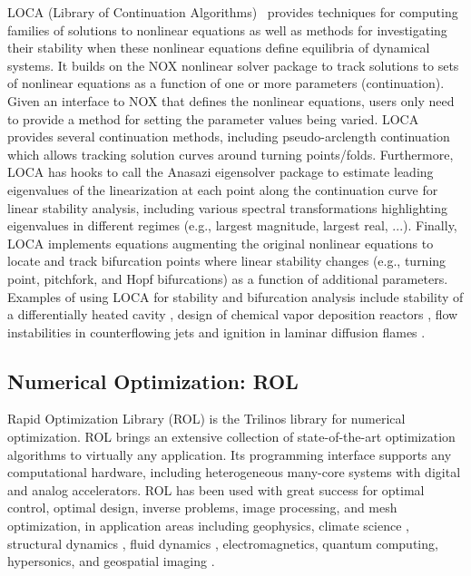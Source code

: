 LOCA (Library of Continuation Algorithms)~\cite{Salinger2005}
provides techniques for computing families of solutions to nonlinear equations as well as methods for investigating their stability when these nonlinear equations define equilibria of dynamical systems.  It builds on the NOX nonlinear solver package to track solutions to sets of nonlinear equations as a function of one or more parameters (continuation).
Given an interface to NOX that defines the nonlinear equations, users only need to provide a method for setting the parameter values being varied.
LOCA provides several continuation methods, including pseudo-arclength continuation which allows tracking solution curves around turning points/folds.  Furthermore, LOCA has hooks to call the Anasazi eigensolver package to estimate leading eigenvalues of the linearization at each point along the continuation curve for linear stability analysis, including various spectral transformations highlighting eigenvalues in different regimes (e.g., largest magnitude, largest real, ...).  Finally, LOCA implements equations augmenting the original nonlinear equations to locate and track bifurcation points where linear stability changes (e.g., turning point, pitchfork, and Hopf bifurcations) as a function of additional parameters. Examples of using LOCA for stability and bifurcation analysis include stability of a differentially heated cavity \cite{Salinger2002}, design of chemical vapor deposition reactors \cite{Pawlowski2001}, flow instabilities in counterflowing jets \cite{pawlowski_salinger_shadid_mountziaris_2006} and ignition in laminar diffusion flames \cite{Shadid20061846}.



\subsection{Numerical Optimization: ROL}
Rapid Optimization Library (ROL) \cite{rol,ROL2022ICCOPT} is the
Trilinos library for numerical optimization. ROL brings an extensive
collection of state-of-the-art optimization algorithms to virtually
any application. Its programming interface supports any computational
hardware, including heterogeneous many-core systems with digital and
analog accelerators.
ROL has been used with great success for optimal control, optimal design,
inverse problems, image processing, and mesh optimization, in application
areas including geophysics, climate science \cite{Perego2022}, structural
dynamics \cite{AQUINO2019323,BUNTING2021107295}, fluid dynamics
\cite{Antil2023}, electromagnetics, quantum computing, hypersonics, and
geospatial imaging \cite{Kouri2014}.

